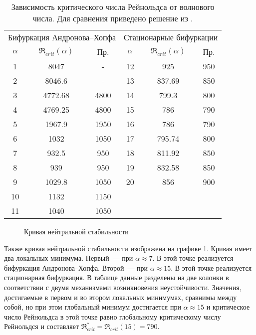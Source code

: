 \begin{table}[htp]
 \begin{tabular}{cccccc}
\hline
\hline
  \multicolumn{3}{c}{Бифуркация Андронова--Хопфа} & \multicolumn{3}{c}{Стационарные бифуркации} \\
  $\alpha$&	$\Re_{crit}(\alpha)$ \cite{lin-stability}&  Пр.&	$\alpha$&	$\Re_{crit}(\alpha)$ \cite{lin-stability}&  Пр. \\
\hline
  1&	8047&		-&	12&	925&		950\\ 
  2&	8046.6&		-&	13&	837.69&		850\\
  3&	4772.68&	4800&	14&	799.3&		800\\
  4&	4769.25&	4800&	15&	786&		790\\
  5&	1967.9&		1950&	16&	786&		790\\
  6&	1032&		1050&	17&	795.74&		800\\
  7&	932.5&		950&	18&	811.92&		850\\
  8&	939&		950&	19&	832.58&		850\\
  9&	1029.8&		1050&	20&	856&		900\\
  10&	1132&		1150\\
  11&	1040&		1050\\
\hline
 \end{tabular}
 \caption{Зависимость критического числа Рейнольдса от волнового числа. Для сравнения приведено решение из \cite{lin-stability}. }
 \label{Re_al}
\end{table}

\begin{figure}
  \center
  
  \caption{Кривая нейтральной стабильности}
  \label{graph:Re_al}
\end{figure}

Также кривая нейтральной стабильности изображена на графике \ref{graph:Re_al}. Кривая имеет два локальных минимума. Первый~--- при $\alpha \approx 7 $. В этой точке реализуется бифуркация Андронова--Хопфа. Второй~--- при $\alpha \approx 15$. В этой точке реализуется стационарная бифуркация. В таблице данные разделены на две колонки в соответствии с двумя механизмами возникновения неустойчивости.  Значения, достигаемые в первом и во втором локальных минимумах, сравнимы между собой, но при этом глобальный минимум достигается при $\alpha \approx 15$ и критическое число Рейнольдса в этой точке равно глобальному критическому числу Рейнольдся и составляет $\Re_{crit}^* = \Re_{crit}(15) = 790$. 

